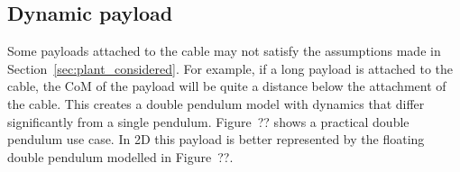 

    \subsection{Dynamic payload} \label{sec:dynamic_payload}
        Some payloads attached to the cable may not satisfy the assumptions made in Section~\ref{sec:plant_considered}.
        For example, if a long payload is attached to the cable, the CoM of the payload will be quite a distance below the attachment of the cable.
        This creates a double pendulum model with dynamics that differ significantly from a single pendulum.
        Figure~?? shows a practical double pendulum use case. 
        In 2D this payload is better represented by the floating double pendulum modelled in Figure~??.

        
